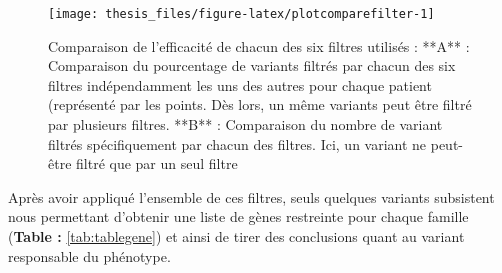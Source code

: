 \documentclass[12pt,twoside]{reedthesis}
\theoremstyle{definition}
\theoremstyle{definition}
\theoremstyle{remark}
\begin{document}
  \newpage
  
  \begin{figure}
  
  {\centering \texttt{[image: thesis\_files/figure-latex/plotcomparefilter-1]} 
  
  }
  
  \caption[Comparaison de l'efficacité de chacun des six filtres utilisés]{Comparaison de l'efficacité de chacun des six filtres utilisés : **A** : Comparaison du pourcentage de variants filtrés par chacun des six filtres indépendamment les uns des autres pour chaque patient (représenté par les points. Dès lors, un même variants peut être filtré par plusieurs filtres. **B** : Comparaison du nombre de variant filtrés spécifiquement par chacun des filtres. Ici, un variant ne peut-être filtré que par un seul filtre}\label{fig:plotcomparefilter}
  \end{figure}
  
  \newpage
  
  Après avoir appliqué l'ensemble de ces filtres, seuls quelques variants
  subsistent nous permettant d'obtenir une liste de gènes restreinte pour
  chaque famille (\textbf{Table : }\ref{tab:tablegene}) et ainsi de tirer
  des conclusions quant au variant responsable du phénotype.
  
\end{document}
